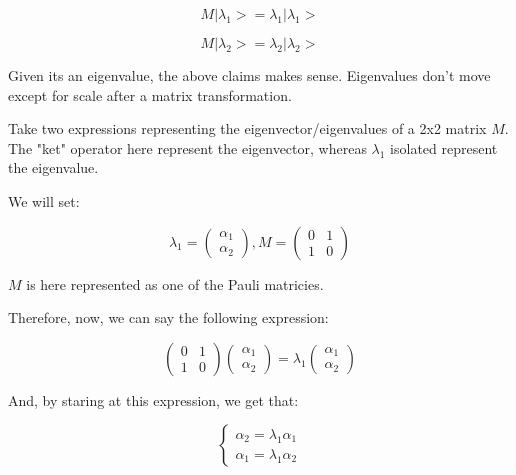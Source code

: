 \documentclass[letterpaper]{article}
\begin{document}
\begin{equation}
   M | \lambda_1 \big> = \lambda_1 | \lambda_1 \big >
\end{equation}

\begin{equation}
   M | \lambda_2 \big> = \lambda_2 | \lambda_2 \big >
\end{equation}

Given its an eigenvalue, the above claims makes sense. Eigenvalues don't move except for scale after a matrix transformation.

Take two expressions representing the eigenvector/eigenvalues of a 2x2 matrix \(M\). The "ket" operator here represent the eigenvector, whereas \(\lambda _1\) isolated represent the eigenvalue.

We will set:

\begin{equation}
   \lambda_1 = \begin{pmatrix} 
\alpha_1 \\
\alpha_2
\end{pmatrix}, M = \begin{pmatrix}
0 & 1 \\
1& 0\end{pmatrix}
\end{equation}

\(M\) is here represented as one of the Pauli matricies.

Therefore, now, we can say the following expression:

\begin{equation}
   \begin{pmatrix}
0 & 1 \\
1&0
   \end{pmatrix}\begin{pmatrix}
\alpha_1 \\\alpha_2
\end{pmatrix} = \lambda_1 \begin{pmatrix}
\alpha_1 \\
\alpha_2 \end{pmatrix}
\end{equation}

And, by staring at this expression, we get that:

\begin{equation}
\begin{cases}    
\alpha_2 = \lambda_1 \alpha_1 \\
\alpha_1 = \lambda_1 \alpha_2
\end{cases}    
\end{equation}
\end{document}
